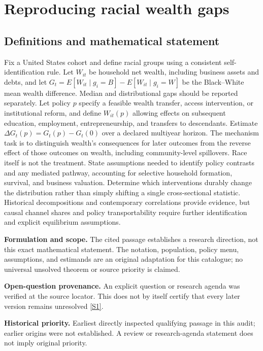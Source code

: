 \documentclass[11pt]{article}
\newcommand{\sref}[2]{\hyperlink{source:#1:#2}{[S#2]}}
\begin{document}
\section*{Reproducing racial wealth gaps}\label{30007647}
\subsection{Definitions and mathematical statement}
Fix a United States cohort and define racial groups using a consistent self-identification rule. Let \(W_{it}\) be household net wealth, including business assets and debts, and let \(G_t=E[W_{it}\mid g_i=B]-E[W_{it}\mid g_i=W]\) be the Black--White mean wealth difference. Median and distributional gaps should be reported separately. Let policy \(p\) specify a feasible wealth transfer, access intervention, or institutional reform, and define \(W_{it}(p)\) allowing effects on subsequent education, employment, entrepreneurship, and transfers to descendants. Estimate \(\Delta G_t(p)=G_t(p)-G_t(0)\) over a declared multiyear horizon. The mechanism task is to distinguish wealth's consequences for later outcomes from the reverse effect of those outcomes on wealth, including community-level spillovers. Race itself is not the treatment. State assumptions needed to identify policy contrasts and any mediated pathway, accounting for selective household formation, survival, and business valuation. Determine which interventions durably change the distribution rather than simply shifting a single cross-sectional statistic. Historical decompositions and contemporary correlations provide evidence, but causal channel shares and policy transportability require further identification and explicit equilibrium assumptions.

\par\textbf{Formulation and scope.} The cited passage establishes a research direction, not this exact mathematical statement. The notation, population, policy menu, assumptions, and estimands are an original adaptation for this catalogue; no universal unsolved theorem or source priority is claimed.

\par\textbf{Open-question provenance.} An explicit question or research agenda was verified at the source locator. This does not by itself certify that every later version remains unresolved \sref{30007647}{1}.

\par\textbf{Historical priority.} Earliest directly inspected qualifying passage in this audit; earlier origins were not established. A review or research-agenda statement does not imply original priority.
\end{document}
